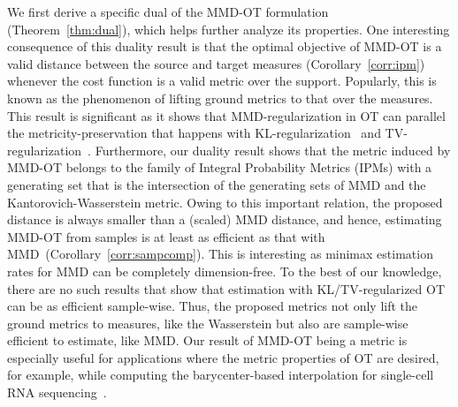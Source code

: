 We first derive a specific dual of the MMD-OT formulation (Theorem~\ref{thm:dual}), which helps further analyze its properties. One interesting consequence of this duality result is that the optimal objective of MMD-OT is a valid distance between the source and target measures (Corollary~\ref{corr:ipm}) whenever the cost function is a valid metric over the support. Popularly, this is known as the phenomenon of lifting ground metrics to that over the measures. This result is significant as it shows that MMD-regularization in OT can parallel the metricity-preservation that happens with KL-regularization~\citep{Liero2018} and TV-regularization~\citep{Piccoli2014GeneralizedWD}. Furthermore, our duality result shows that the metric induced by MMD-OT belongs to the family of Integral Probability Metrics (IPMs) with a generating set that is the intersection of the generating sets of MMD and the Kantorovich-Wasserstein metric. Owing to this important relation, the proposed distance is always smaller than a (scaled) MMD distance, and hence, estimating MMD-OT from samples is at least as efficient as that with MMD~(Corollary~\ref{corr:sampcomp}). This is interesting as minimax estimation rates for MMD can be completely dimension-free. To the best of our knowledge, there are no such results that show that estimation with KL/TV-regularized OT can be as efficient sample-wise. Thus, the proposed metrics not only lift the ground metrics to measures, like the Wasserstein but also are sample-wise efficient to estimate, like MMD. Our result of MMD-OT being a metric is especially useful for applications where the metric properties of OT are desired, for example, while computing the barycenter-based interpolation for single-cell RNA sequencing~\citep{TNet20}. 

